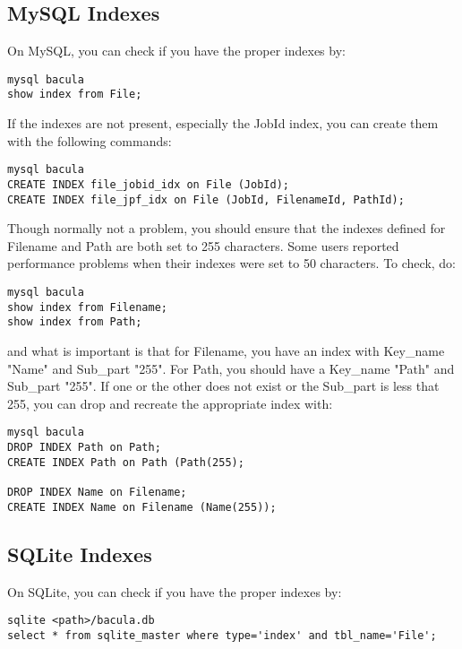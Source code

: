 \subsection{MySQL Indexes}
On MySQL, you can check if you have the proper indexes by:

\footnotesize
\begin{verbatim}
mysql bacula
show index from File;
\end{verbatim}
\normalsize

If the indexes are not present, especially the JobId index, you can
create them with the following commands:

\footnotesize
\begin{verbatim}
mysql bacula
CREATE INDEX file_jobid_idx on File (JobId);
CREATE INDEX file_jpf_idx on File (JobId, FilenameId, PathId);
\end{verbatim}
\normalsize

Though normally not a problem, you should ensure that the indexes 
defined for Filename and Path are both set to 255 characters. Some users 
reported performance problems when their indexes were set to 50 characters.
To check, do:

\footnotesize
\begin{verbatim}
mysql bacula
show index from Filename;
show index from Path;
\end{verbatim}
\normalsize

and what is important is that for Filename, you have an index with
Key\_name "Name" and Sub\_part "255". For Path, you should have a Key\_name
"Path" and Sub\_part "255".  If one or the other does not exist or the
Sub\_part is less that 255, you can drop and recreate the appropriate
index with:

\footnotesize
\begin{verbatim}
mysql bacula
DROP INDEX Path on Path;
CREATE INDEX Path on Path (Path(255);

DROP INDEX Name on Filename;
CREATE INDEX Name on Filename (Name(255));
\end{verbatim}
\normalsize


\subsection{SQLite Indexes}
On SQLite, you can check if you have the proper indexes by:

\footnotesize
\begin{verbatim}
sqlite <path>/bacula.db
select * from sqlite_master where type='index' and tbl_name='File';
\end{verbatim}
\normalsize

